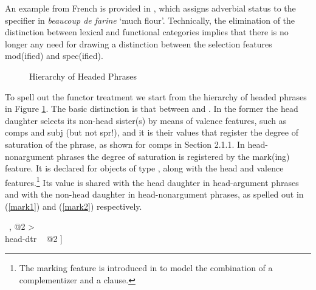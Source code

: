 \documentclass[output=paper]{langsci/langscibook}
\begin{document}
\noindent
An example from French is provided in \citet{Abeilleetal04}, 
which assigns adverbial status to the specifier in 
\emph{beaucoup de farine} `much flour'.  
Technically, the elimination of the distinction between lexical and 
functional categories implies that there is no longer any need for 
drawing a distinction between the selection features {\sc mod(ified)} and {\sc spec(ified)}. 

\begin{figure}
\begin{center} 
\footnotesize
{}
\caption{\label{typ} Hierarchy of Headed Phrases }
\normalsize
\end{center}
\end{figure}

To spell out the functor treatment we start from the 
hierarchy of headed phrases in Figure \ref{typ}. The basic distinction is
that between  and . 
In the former the head daughter selects its non-head sister(s) by means of 
valence features, such as {\sc comps} and {\sc subj} (but not {\sc spr}!), 
and it is their values that register the degree of saturation of the phrase, 
as shown for {\sc comps} in Section 2.1.1.  
In head-nonargument phrases the degree of saturation is registered  
by the {\sc mark(ing)} feature. It is declared for objects of type , 
along with the {\sc head} and valence features.\footnote{The {\sc marking} feature  
is introduced in \citet[46]{ps2} to model the combination of a complementizer 
and a clause.} Its value is shared with the head daughter in head-argument phrases
and with the non-head daughter in head-nonargument phrases, as spelled out in 
(\ref{mark1}) and (\ref{mark2}) respectively. 

\begin{exe}
\ex\label{mark1} 
\begin{avm}
\end{avm}
\ex\label{mark2} 
\begin{avm}
[\type{head-nonarg-phr}                    \\
 synsem|loc|cat|mark ~ @1 \type{marking}   \\
 dtrs ~ <[synsem|loc|cat|mark ~ @1] ~, @2 > \\
 head-dtr ~ @2 ]
\end{avm}
\end{exe}
\end{document}
